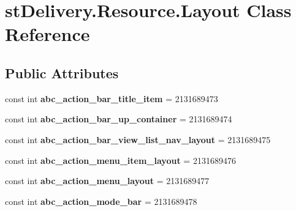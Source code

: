 \hypertarget{classst_delivery_1_1_resource_1_1_layout}{}\section{st\+Delivery.\+Resource.\+Layout Class Reference}
\label{classst_delivery_1_1_resource_1_1_layout}
\subsection*{Public Attributes}
\begin{DoxyCompactItemize}
\item 
\mbox{\label{classst_delivery_1_1_resource_1_1_layout_aaa0cd17d03dc0ba22794c5ba0de90b9e}} 
const int {\bfseries abc\+\_\+action\+\_\+bar\+\_\+title\+\_\+item} = 2131689473
\item 
\mbox{\label{classst_delivery_1_1_resource_1_1_layout_a2ad04ca40213a0efdbe5511afcba5904}} 
const int {\bfseries abc\+\_\+action\+\_\+bar\+\_\+up\+\_\+container} = 2131689474
\item 
\mbox{\label{classst_delivery_1_1_resource_1_1_layout_a1455011845d23a0a483c9a7b3f857d14}} 
const int {\bfseries abc\+\_\+action\+\_\+bar\+\_\+view\+\_\+list\+\_\+nav\+\_\+layout} = 2131689475
\item 
\mbox{\label{classst_delivery_1_1_resource_1_1_layout_aa62ac3d5f2694fea9472be0f55ebaa35}} 
const int {\bfseries abc\+\_\+action\+\_\+menu\+\_\+item\+\_\+layout} = 2131689476
\item 
\mbox{\label{classst_delivery_1_1_resource_1_1_layout_a1d36a178c0584b5d4303895110dc0ab7}} 
const int {\bfseries abc\+\_\+action\+\_\+menu\+\_\+layout} = 2131689477
\item 
\mbox{\label{classst_delivery_1_1_resource_1_1_layout_a8a7e7ca9801d732284994afdb4582eb2}} 
const int {\bfseries abc\+\_\+action\+\_\+mode\+\_\+bar} = 2131689478
\item 
\mbox{\label{classst_delivery_1_1_resource_1_1_layout_aeb23d3baceb110635065be5ea7885b9d}} 

\end{DoxyCompactItemize}
